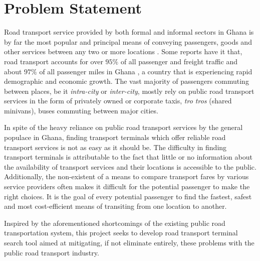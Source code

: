 \section{Problem Statement}
Road transport service provided by both formal and informal sectors in Ghana is by far the most popular and principal means of conveying passengers, goods and other services between any two or more locations \citep{aidoo_passengers_2013}. Some reports have it that, road transport accounts for over $ 95\% $ of all passenger and freight traffic and about $ 97\% $ of all passenger miles in Ghana \citep[p.~195]{unesco_transportation:_????}, a country that is experiencing rapid demographic and economic growth. The vast majority of passengers commuting between places, be it \textit{intra-city} or \textit{inter-city}, mostly rely on public road transport services in the form of privately owned or corporate taxis, \textit{tro tros} (shared minivans), buses commuting between major cities.

In spite of the heavy reliance on public road transport services by the general populace in Ghana, finding transport terminals which offer reliable road transport services is not as easy as it should be. The difficulty in finding transport terminals is attributable to the fact that little or no information about the availability of transport services and their locations is accessible to the public. Additionally, the non-existent of a means to compare transport fares by various service providers often makes it difficult for the potential passenger to make the right choices. It is the goal of every potential passenger to find the fastest, safest and most cost-efficient means of transiting from one location to another. 

Inspired by the aforementioned shortcomings of the existing public road transportation system, this project seeks to develop road transport terminal search tool
aimed at mitigating, if not eliminate entirely, these problems with the public road transport industry.

